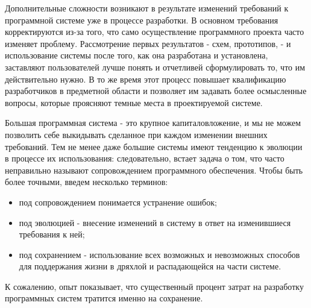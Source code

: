 \documentclass[11pt]{article}
\begin{document}
Дополнительные сложности возникают в результате изменений требований к программной системе уже в процессе разработки. В основном требования корректируются из-за того, что само осуществление программного проекта часто изменяет проблему. Рассмотрение первых результатов - схем, прототипов, - и использование системы после того, как она разработана и установлена, заставляют пользователей лучше понять и отчетливей сформулировать то, что им действительно нужно. В то же время этот процесс повышает квалификацию разработчиков в предметной области и позволяет им задавать более осмысленные вопросы, которые проясняют темные места в проектируемой системе. \par
Большая программная система - это крупное капиталовложение, и мы не можем позволить себе выкидывать сделанное при каждом изменении внешних требований. Тем не менее даже большие системы имеют тенденцию к эволюции в процессе их использования: следовательно, встает задача о том, что часто неправильно называют сопровождением программного обеспечения. Чтобы быть более точными, введем несколько терминов: 
\begin{itemize}
    \item под сопровождением понимается устранение ошибок;
    \item под эволюцией - внесение изменений в систему в ответ на изменившиеся требования к ней;
    \item под сохранением - использование всех возможных и невозможных способов для поддержания жизни в дряхлой и распадающейся на части системе.
\end{itemize}\par
К сожалению, опыт показывает, что существенный процент затрат на разработку программных систем тратится именно на сохранение. \par
\end{document}
